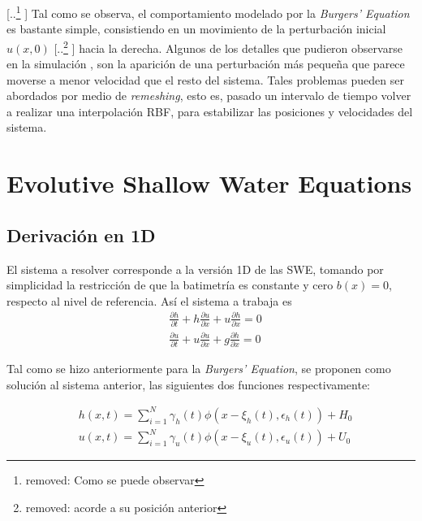 \documentclass[spanish]{article} %
\providecommand{\DIFaddtex}[1]{{\protect\color{blue} \sf #1}} %
\providecommand{\DIFdeltex}[1]{{\protect\color{red} [..\footnote{removed: #1} ]}} %
\providecommand{\DIFaddbegin}{} %
\providecommand{\DIFaddend}{} %
\providecommand{\DIFdelbegin}{} %
\providecommand{\DIFdelend}{} %
\providecommand{\DIFadd}[1]{\texorpdfstring{\DIFaddtex{#1}}{#1}} %
\providecommand{\DIFdel}[1]{\texorpdfstring{\DIFdeltex{#1}}{}} %
\begin{document}
    \DIFdelbegin \DIFdel{Como se puede observar}\DIFdelend \DIFaddbegin \DIFadd{Tal como se observa}\DIFaddend , el comportamiento modelado por la \textit{Burgers' Equation} es bastante simple, consistiendo en un
    movimiento de la perturbación inicial $u(x,0)$ \DIFdelbegin \DIFdel{acorde a su posición anterior}\DIFdelend \DIFaddbegin \DIFadd{hacia la derecha}\DIFaddend . Algunos de los detalles que pudieron
    observarse en la simulación\DIFaddbegin \DIFadd{, }\DIFaddend son la aparición de una perturbación más pequeña que parece moverse a menor velocidad que el
    resto del sistema. \DIFaddbegin \DIFadd{Tales problemas pueden ser abordados por medio de \textit{remeshing}, esto es, pasado un intervalo de tiempo volver a realizar una interpolación RBF, para estabilizar las posiciones y velocidades del sistema.
    }

    \section{\DIFadd{Evolutive Shallow Water Equations}}

    \subsection{\DIFadd{Derivación en 1D}}

    \DIFadd{El sistema a resolver corresponde a la versión 1D de las SWE, tomando por simplicidad la restricción de que la batimetría es constante y cero $b(x)=0$, respecto al nivel de referencia. Así el sistema a trabaja es
}\begin{align}
 & \frac{\partial h}{\partial t} + h \frac{\partial u}{\partial x} + u \frac{\partial h}{\partial x} = 0 \label{eq:continuity}\\
 & \frac{\partial u}{\partial t} + u \frac{\partial u}{\partial x} + g \frac{\partial h}{\partial x} = 0 \label{eq:momentum}
\end{align}

    \DIFadd{Tal como se hizo anteriormente para la \textit{Burgers' Equation}, se proponen como solución al sistema anterior, las siguientes dos funciones respectivamente:
}

\begin{align}
     & h(x,t) = \sum_{i=1}^{N} \gamma_h(t)\phi(x-\xi_h(t),\epsilon_h(t)) + H_0 \label{eq:happ}\\
     & u(x,t) = \sum_{i=1}^{N} \gamma_u(t)\phi(x-\xi_u(t),\epsilon_u(t)) + U_0 \label{eq:uapp}
 \end{align}
\end{document}
